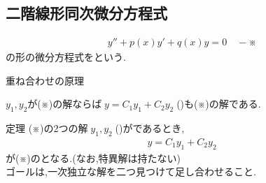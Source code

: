 \documentclass[a4paper]{jsarticle}
\begin{document}
\subsection{二階線形同次微分方程式}
\begin{eqnarray*}
    y''+p\left(x\right)y'+q\left(x\right)y=0\quad -※
\end{eqnarray*}
の形の微分方程式をという.
\begin{itembox}[l]{重ね合わせの原理}
    \begin{center}
        $y_1,y_2$が(※)の解ならば$\; y=C_1y_1+C_2y_2\;$()も(※)の解である.
    \end{center}
\end{itembox}
\begin{itembox}[l]{定理}
    (※)の2つの解$\;y_1,y_2\;$()がであるとき,
    \begin{eqnarray*}
        y=C_1y_1+C_2y_2
    \end{eqnarray*}
    が(※)のとなる.(なお,特異解は持たない)\\
    ゴールは,一次独立な解を二つ見つけて足し合わせること.
\end{itembox}
\end{document}
